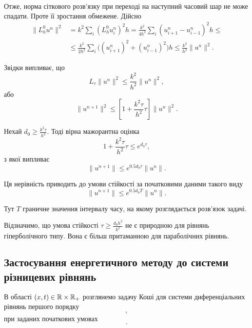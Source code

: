 Отже, норма сіткового розв'язку при переході на наступний часовий шар не може спадати. Проте її зростання обмежене. Дійсно
\begin{align*}
    \|L_h^0 u^n\|^2
    &= k^2 \sum_i (L_h^0 u_i^n)^2 h
    = \frac{k^2}{4h^2} \sum_i (u_{i+1}^n - u_{i-1}^n)^2 h \le \\
    &\le
    \frac{k^2}{2h^2} \sum_i \Big( (u_{i+1}^n)^2 + (u_{i-1}^n)^2 \Big) h \le \frac{k^2}{h^2} \|u^n\|^2.
\end{align*}

Звідки випливає, що
\begin{equation*}
    L_\tau \|u^n\|^2 \le \frac{k^2}{h^2} \|u^n\|^2,
\end{equation*}
або
\begin{equation*}
    \|u^{n+1}\|^2 \le \left[ 1 + \frac{k^2 \tau}{h^2} \tau \right] \|u^n\|^2.
\end{equation*}
 
Нехай $d_0 \ge \frac{k^2 \tau}{h^2}$. Тоді вірна мажорантна оцінка
\begin{equation*}
    1 + \frac{k^2 \tau}{h^2} \tau  \le e^{d_0 \tau},
\end{equation*}
з якої випливає
\begin{equation*}
    \|u^{n+1}\| \le e^{0.5 d_0 \tau} \|u^n\|.
\end{equation*}

Ця нерівність приводить до умови стійкості за початковими даними такого виду
\begin{equation*}
    \|u^{n+1}\| \le e^{0.5 d_0 T} \|u^n\|.
\end{equation*}

Тут $T$ граничне значення інтервалу часу, на якому розглядається розв'язок задачі. \medskip

Відзначимо, що умова стійкості $\tau \ge \frac{d_0 h^2}{k^2}$ не є природною для рівнянь гіперболічного типу. Вона є більш притаманною для параболічних рівнянь.

\subsection{ Застосування енергетичного методу до системи різницевих рівнянь}

В області $(x, t) \in \mathbb{R} \times \mathbb{R}_+$ розглянемо задачу Коші для системи диференціальних рівнянь першого порядку 
\begin{equation*}
    ,
\end{equation*}
при заданих початкових умовах
\begin{equation*}
    .
\end{equation*}

